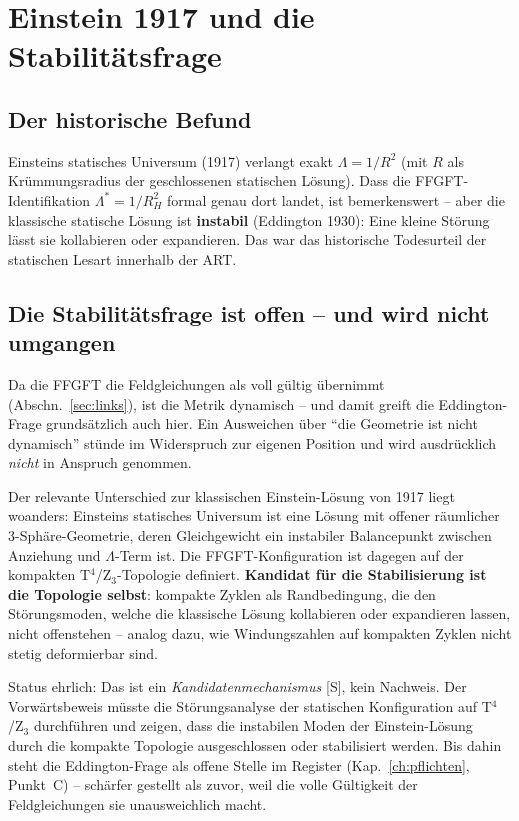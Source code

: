\chapter{Einstein 1917 und die Stabilitätsfrage}
\label{ch:einstein1917}

\section{Der historische Befund}

Einsteins statisches Universum (1917) verlangt exakt
$\Lambda = 1/R^2$ (mit $R$ als Krümmungsradius der geschlossenen
statischen Lösung). Dass die FFGFT-Identifikation
$\Lambda^{*} = 1/R_H^2$ formal genau dort landet, ist bemerkenswert --
aber die klassische statische Lösung ist \textbf{instabil}
(Eddington 1930): Eine kleine Störung lässt sie kollabieren oder
expandieren. Das war das historische Todesurteil der statischen
Lesart innerhalb der ART.

\section{Die Stabilitätsfrage ist offen -- und wird nicht umgangen}
\label{sec:stabfrage}

Da die FFGFT die Feldgleichungen als voll gültig übernimmt
(Abschn.~\ref{sec:links}), ist die Metrik dynamisch -- und damit greift die
Eddington-Frage grundsätzlich auch hier. Ein Ausweichen über
\enquote{die Geometrie ist nicht dynamisch} stünde im Widerspruch
zur eigenen Position und wird ausdrücklich \emph{nicht} in Anspruch
genommen.

Der relevante Unterschied zur klassischen Einstein-Lösung von 1917
liegt woanders: Einsteins statisches Universum ist eine Lösung mit
offener räumlicher 3-Sphäre-Geometrie, deren Gleichgewicht ein
instabiler Balancepunkt zwischen Anziehung und $\Lambda$-Term ist.
Die FFGFT-Konfiguration ist dagegen auf der kompakten
T$^4$/Z$_3$-Topologie definiert. \textbf{Kandidat für die
Stabilisierung ist die Topologie selbst}: kompakte Zyklen als
Randbedingung, die den Störungsmoden, welche die klassische Lösung
kollabieren oder expandieren lassen, nicht offenstehen -- analog
dazu, wie Windungszahlen auf kompakten Zyklen nicht stetig
deformierbar sind.

Status ehrlich: Das ist ein \emph{Kandidatenmechanismus} [S], kein
Nachweis. Der Vorwärtsbeweis müsste die Störungsanalyse der
statischen Konfiguration auf T$^4$/Z$_3$ durchführen und zeigen,
dass die instabilen Moden der Einstein-Lösung durch die kompakte
Topologie ausgeschlossen oder stabilisiert werden. Bis dahin steht
die Eddington-Frage als offene Stelle im Register (Kap.~\ref{ch:pflichten}, Punkt~C)
-- schärfer gestellt als zuvor, weil die volle Gültigkeit der
Feldgleichungen sie unausweichlich macht.

